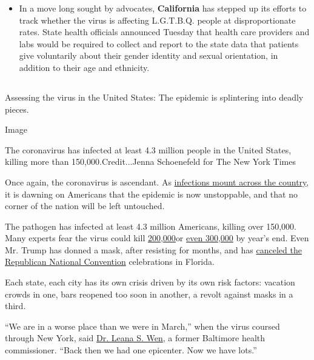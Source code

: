 \begin{itemize}
\tightlist
\item
  In a move long sought by advocates, \textbf{California} has stepped up
  its efforts to track whether the virus is affecting L.G.T.B.Q. people
  at disproportionate rates. State health officials announced Tuesday
  that health care providers and labs would be required to collect and
  report to the state data that patients give voluntarily about their
  gender identity and sexual orientation, in addition to their age and
  ethnicity.
\end{itemize}

\hypertarget{-7}{%
\subsection{}\label{-7}}

Assessing the virus in the United States: The epidemic is splintering
into deadly pieces.

Image

The coronavirus has infected at least 4.3 million people in the United
States, killing more than 150,000.Credit...Jenna Schoenefeld for The New
York Times

Once again, the coronavirus is ascendant. As
\href{https://www.nytimes3xbfgragh.onion/interactive/2020/us/coronavirus-us-cases.html}{infections
mount across the country}, it is dawning on Americans that the epidemic
is now unstoppable, and that no corner of the nation will be left
untouched.

The pathogen has infected at least 4.3 million Americans, killing over
150,000. Many experts fear the virus could kill
\href{https://www.forbes.com/sites/mattperez/2020/07/07/imhe-model-projects-208255-us-deaths-by-november-but-estimate-falls-sharply-if-mask-use-increases/\#3c8ee9616f2e}{200,000}or
\href{https://www.cnbc.com/2020/07/22/dr-scott-gottlieb-us-coronavirus-deaths-may-hit-300000-by-year-end.html}{even
300,000} by year's end. Even Mr. Trump has donned a mask, after
resisting for months, and has
\href{https://www.nytimes3xbfgragh.onion/2020/07/23/us/politics/jacksonville-rnc.html}{canceled
the Republican National Convention} celebrations in Florida.

Each state, each city has its own crisis driven by its own risk factors:
vacation crowds in one, bars reopened too soon in another, a revolt
against masks in a third.

``We are in a worse place than we were in March,'' when the virus
coursed through New York, said
\href{https://www.gwumc.edu/smhs/facultydirectory/profile.cfm?empName=Leana\%20Wen\&FacID=2073685428}{Dr.
Leana S. Wen}, a former Baltimore health commissioner. ``Back then we
had one epicenter. Now we have lots.''

